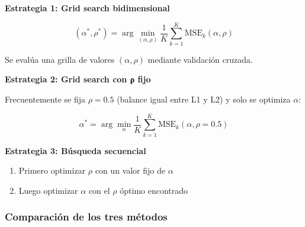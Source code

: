 \documentclass[
  doc,
  floatsintext,
  longtable,
  a4paper,
  nolmodern,
  notxfonts,
  notimes,
  12pt,
  colorlinks=true,linkcolor=blue,citecolor=blue,urlcolor=blue]{apa7}
\providecommand{\tightlist}{%
  \setlength{\itemsep}{0pt}\setlength{\parskip}{0pt}}
\begin{document}
\textbf{Estrategia 1: Grid search bidimensional}

\[
(\alpha^*, \rho^*) = \arg\min_{(\alpha, \rho)} \frac{1}{K} \sum_{k=1}^{K} \text{MSE}_k(\alpha, \rho)
\]

Se evalúa una grilla de valores \((\alpha, \rho)\) mediante validación
cruzada.

\textbf{Estrategia 2: Grid search con ρ fijo}

Frecuentemente se fija \(\rho = 0.5\) (balance igual entre L1 y L2) y
solo se optimiza \(\alpha\):

\[
\alpha^* = \arg\min_{\alpha} \frac{1}{K} \sum_{k=1}^{K} \text{MSE}_k(\alpha, \rho=0.5)
\]

\textbf{Estrategia 3: Búsqueda secuencial}

\begin{enumerate}
\def\labelenumi{\arabic{enumi}.}
\tightlist
\item
  Primero optimizar \(\rho\) con un valor fijo de \(\alpha\)
\item
  Luego optimizar \(\alpha\) con el \(\rho\) óptimo encontrado
\end{enumerate}

\subsubsection{Comparación de los tres
métodos}\label{comparaciuxf3n-de-los-tres-muxe9todos}
\end{document}
